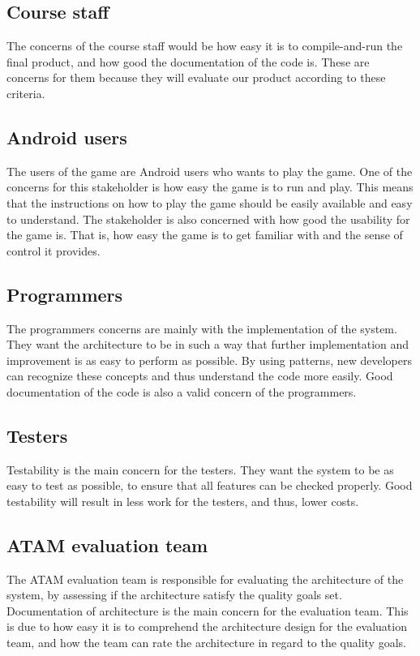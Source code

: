 \label{stakeholders}

\subsection{Course staff}
The concerns of the course staff would be how easy it is to compile-and-run the final product, and how good the documentation of the code
is. These are concerns for them because they will evaluate our product according to these criteria.

\subsection{Android users}
The users of the game are Android users who wants to play the game. One of the concerns for this stakeholder is how easy the game is to run and
play. This means that the instructions on how to play the game should be easily
available and easy to understand. The stakeholder is also concerned with how good the usability for the game is. That is, how easy the game is to get familiar with and the sense of control it provides.

\subsection{Programmers }
The programmers concerns are mainly with the implementation of the system. They want the architecture to be in such a way that further implementation and improvement is as easy to perform as possible. By using patterns, new developers can recognize these concepts and thus understand the code more easily. Good documentation of the code is also a valid concern of the programmers.

\subsection{Testers} 
Testability is the main concern for the testers. They want the system to be as easy to test as possible, to ensure that all features can be checked properly. Good testability will result in less work for the testers, and thus, lower costs.

\subsection{ATAM evaluation team}
The ATAM evaluation team is responsible for evaluating the architecture of the system, by assessing if the architecture satisfy the quality goals set. Documentation of architecture is the main concern for the evaluation team. This is due to how easy it is to comprehend the architecture design for the evaluation team, and how the team can rate the architecture in regard to the quality goals.
